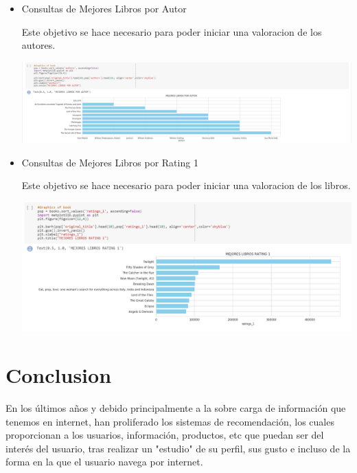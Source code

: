 \documentclass[preprint,12pt]{elsarticle}
\begin{document}
\begin{itemize}
\item Consultas de Mejores Libros por Autor 

Este objetivo se hace necesario para poder iniciar una valoracion de los autores.

\begin {center}
\includegraphics[scale= 0.40]{./Imagenes/mejores_libros_p_autor.png}
\end {center}


\item Consultas de Mejores Libros por Rating 1

Este objetivo se hace necesario para poder iniciar una valoracion de los libros.

\begin {center}
\includegraphics[scale= 0.50]{./Imagenes/mejores_libros_rating_1.png}
\end {center}


\end{itemize}


\section{Conclusion}

En los últimos años y debido principalmente a la sobre carga de información que tenemos en internet, han proliferado los sistemas de recomendación, los cuales proporcionan a los usuarios, información, productos, etc que puedan ser del interés del usuario, tras realizar un "estudio" de su perfil, sus gusto e incluso de la forma en la que el usuario navega por internet.
\end{document}
